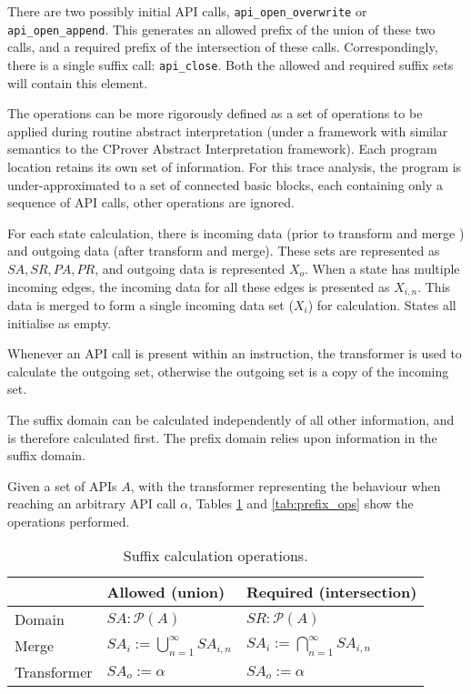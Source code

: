 \documentclass[EPiCempty]{easychair}
\begin{document}
There are two possibly initial API calls, \texttt{api\_open\_overwrite} or  \texttt{api\_open\_append}.  This generates an allowed prefix of the union of these two calls, and a required prefix of the intersection of these calls.   Correspondingly, there is a single suffix call: \texttt{api\_close}.  Both the allowed and required suffix sets will contain this element.




The operations can be more rigorously defined as a set of operations to be applied during routine abstract interpretation (under a framework with similar semantics to the CProver Abstract Interpretation framework).  Each program location retains its own set of information.  For this trace analysis, the program is under-approximated to a set of connected basic blocks, each containing only a sequence of API calls, other operations are ignored.  

For each state calculation, there is incoming data (prior to transform and merge ) and outgoing data (after transform and merge).  These sets are represented as $SA, SR, PA, PR$, and outgoing data is represented $X_o$.  When a state has multiple incoming edges, the incoming data for all these edges is presented as $X_{i, n}$.  This data is merged to form a single incoming data set ($X_i$) for calculation.  States all initialise as empty.

Whenever an API call is present within an instruction, the transformer is used to calculate the outgoing set, otherwise the outgoing set is a copy of the incoming set.

The suffix domain can be calculated independently of all other information, and is therefore calculated first.  The prefix domain relies upon information in the suffix domain.

Given a set of APIs $A$, with the transformer representing the behaviour when reaching an arbitrary API call $\alpha$, Tables \ref{tab:suffix_ops} and \ref{tab:prefix_ops} show the operations performed.




\begin{table}
	\centering
	\renewcommand{\arraystretch}{1.4}
	\label{tab:suffix_ops}
	\begin{tabular}{|l|l|l|}
		\hline
		& Allowed (union)  &  Required (intersection)\\\hline
		Domain	& $ SA : \mathcal{P}(A)$ &$ SR : \mathcal{P}(A)$ \\
		Merge	& $SA_i := \bigcup_{n=1}^{\infty} SA_{i,n}$ & $SA_i := \bigcap_{n=1}^{\infty} SA_{i,n}$\\
		Transformer	& $SA_o := \alpha$ & $SA_o := \alpha$ \\\hline
		
	\end{tabular}
	\caption{Suffix calculation operations.}
\end{table}
\end{document}
